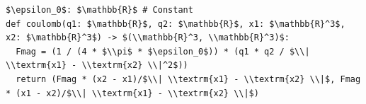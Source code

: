 \documentclass[border=10pt]{standalone}
\begin{document}
\begin{lstlisting}
$\epsilon_0$: $\mathbb{R}$ # Constant
def coulomb(q1: $\mathbb{R}$, q2: $\mathbb{R}$, x1: $\mathbb{R}^3$, x2: $\mathbb{R}^3$) -> $(\\mathbb{R}^3, \\mathbb{R}^3)$:
  Fmag = (1 / (4 * $\\pi$ * $\epsilon_0$)) * (q1 * q2 / $\\| \\textrm{x1} - \\textrm{x2} \\|^2$))
  return (Fmag * (x2 - x1)/$\\| \\textrm{x1} - \\textrm{x2} \\|$, Fmag * (x1 - x2)/$\\| \\textrm{x1} - \\textrm{x2} \\|$)
\end{lstlisting}
\end{document}
